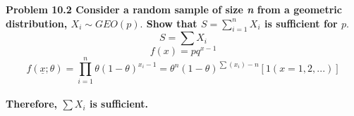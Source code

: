 
\bf{Problem 10.2} Consider a random sample of size \textit{n} from a geometric distribution, $ X_{i} \sim GEO(p). $ Show that $ S=\sum_{i=1}^{n}X_{i} $ is sufficient for $ p. $ 
\\ \[ S=\sum X_{i}\] \[f(x)=pq^{x-1}\] \[f( \underline{x}; \theta )=\prod_{i=1}^{n} \theta (1- \theta )^{x_{i}-1}= \theta^{n} (1- \theta )^{\sum (x_{i})-n}[1(x=1,2,...)] \]
\\ Therefore, $ \sum X_{i} $ is sufficient.